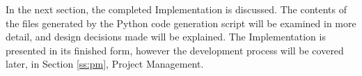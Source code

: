 \vspace{4em}
\noindent In the next section, the completed Implementation is discussed. The contents of the files generated by the Python code generation script will be examined in more detail, and design decisions made will be explained. The Implementation is presented in its finished form, however the development process will be covered later, in Section \ref{ss:pm}, Project Management.
